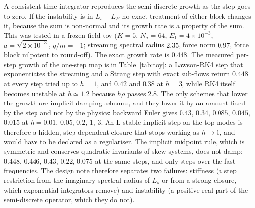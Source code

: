 A consistent time integrator reproduces the semi-discrete growth as the step goes to zero. If the instability is in $L_s+L_E$ no exact treatment of either block changes it, because the sum is non-normal and its growth rate is a property of the sum. This was tested in a frozen-field toy ($K=5$, $N_n=64$, $E_1=4\times10^{-3}$, $a=\sqrt{2\times10^{-3}}$, $q/m=-1$; streaming spectral radius $2.35$, force norm $0.97$, force block nilpotent to round-off). The exact growth rate is $0.448$. The measured per-step growth of the one-step map is in Table~\ref{tab:toy}: a Lawson-RK4 step that exponentiates the streaming and a Strang step with exact sub-flows return $0.448$ at every step tried up to $h=1$, and $0.42$ and $0.38$ at $h=3$, while RK4 itself becomes unstable at $h\simeq1.2$ because $h\rho$ passes $2.8$. The only schemes that lower the growth are implicit damping schemes, and they lower it by an amount fixed by the step and not by the physics: backward Euler gives $0.43$, $0.34$, $0.085$, $0.045$, $0.015$ at $h=0.01$, $0.05$, $0.2$, $1$, $3$. An L-stable implicit step on the top modes is therefore a hidden, step-dependent closure that stops working as $h\to0$, and would have to be declared as a regulariser. The implicit midpoint rule, which is symmetric and conserves quadratic invariants of skew systems, does not damp: $0.448$, $0.446$, $0.43$, $0.22$, $0.075$ at the same steps, and only steps over the fast frequencies. The design note therefore separates two failures: stiffness (a step restriction from the imaginary spectral radius of $L_s$ or from a strong closure, which exponential integrators remove) and instability (a positive real part of the semi-discrete operator, which they do not).

\begin{table}[t]
\caption{Growth rate per unit time of the one-step map for the frozen toy field (exact $0.448$), from \texttt{studies/imex/}. This check was not gated.}\label{tab:toy}
\small
{}
\end{table}

